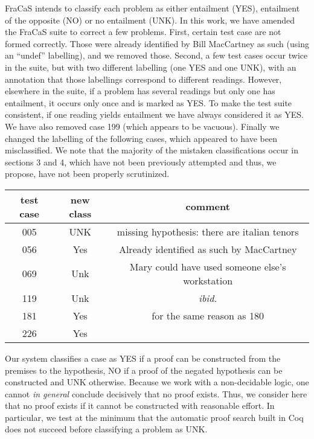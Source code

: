 \documentclass{article}
\begin{document}
FraCaS intends to classify each problem as either entailment (YES),
entailment of the opposite (NO) or no entailment (UNK).  In this work,
we have amended the FraCaS suite to correct a few problems. First,
certain test case are not formed correctly. Those were already
identified by Bill MacCartney as such (using an ``undef''
labelling), and we removed those. Second, a few test cases occur twice
in the suite, but with two different labelling (one YES and one UNK),
with an annotation that those labellings correspond to different
readings. However, elsewhere in the suite, if a problem has several
readings but only one has entailment, it occurs only once and is
marked as YES. To make the test suite consistent, if one reading
yields entailment we have always considered it as YES. We have also
removed case 199 (which appears to be vacuous). Finally we changed the
labelling of the following cases, which appeared to have been
misclassified. We note that the majority of the mistaken
classifications occur in sections 3 and 4, which have not been
previously attempted and thus, we propose, have not been properly
scrutinized.

\begin{center}
\begin{tabular}{ccc}
 test case & new class & comment \\ \hline
    005 & UNK & missing hypothesis: there are italian tenors \\
   056 &  Yes & Already identified as such by MacCartney \\
  069 & Unk & Mary could have used someone else's workstation \\
  119 & Unk & \textit{ibid.} \\
  181 & Yes & for the same reason as 180 \\
  226 & Yes &
\end{tabular}
\end{center}

Our system classifies a case as YES if a proof can be constructed from
the premises to the hypothesis, NO if a proof of the negated
hypothesis can be constructed and UNK otherwise. Because we work with
a non-decidable logic, one cannot \emph{in general} conclude
decisively that no proof exists. Thus, we consider here that no proof
exists if it cannot be constructed with reasonable effort. In
particular, we test at the minimum that the automatic proof search
built in Coq does not succeed before classifying a problem as UNK.
\end{document}
